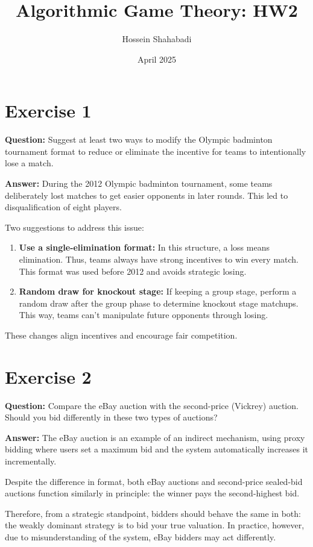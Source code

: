 \documentclass[12pt]{article}
\title{Algorithmic Game Theory: HW2}
\author{Hossein Shahabadi}
\date{April 2025}
\begin{document}
\maketitle

\section*{Exercise 1}

\textbf{Question:} Suggest at least two ways to modify the Olympic badminton tournament format to reduce or eliminate the incentive for teams to intentionally lose a match.

\textbf{Answer:} During the 2012 Olympic badminton tournament, some teams deliberately lost matches to get easier opponents in later rounds. This led to disqualification of eight players.

Two suggestions to address this issue:
\begin{enumerate}[label=\arabic*.]
  \item \textbf{Use a single-elimination format:} In this structure, a loss means elimination. Thus, teams always have strong incentives to win every match. This format was used before 2012 and avoids strategic losing.
  \item \textbf{Random draw for knockout stage:} If keeping a group stage, perform a random draw after the group phase to determine knockout stage matchups. This way, teams can’t manipulate future opponents through losing.
\end{enumerate}

These changes align incentives and encourage fair competition.

\section*{Exercise 2}

\textbf{Question:} Compare the eBay auction with the second-price (Vickrey) auction. Should you bid differently in these two types of auctions?

\textbf{Answer:} The eBay auction is an example of an indirect mechanism, using proxy bidding where users set a maximum bid and the system automatically increases it incrementally.

Despite the difference in format, both eBay auctions and second-price sealed-bid auctions function similarly in principle: the winner pays the second-highest bid.

Therefore, from a strategic standpoint, bidders should behave the same in both: the weakly dominant strategy is to bid your true valuation. In practice, however, due to misunderstanding of the system, eBay bidders may act differently.
\end{document}

